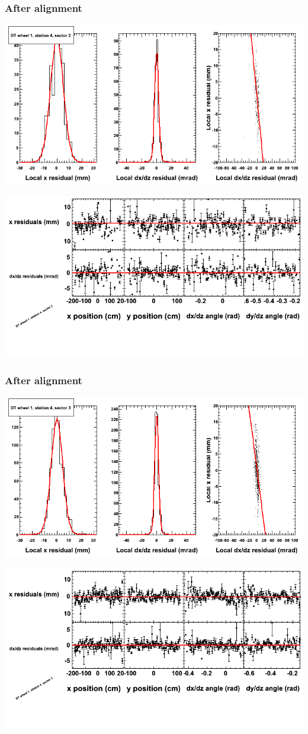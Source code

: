 \documentclass[compress]{beamer}
\begin{document}
\begin{frame}
\frametitle{After alignment}
\includegraphics[width=0.7\linewidth]{NOV4_fitfunctions/MBwhDst4sec02_bellcurves.png}

\includegraphics[width=0.7\linewidth]{NOV4_fitfunctions/MBwhDst4sec02_polynomials.png}
\end{frame}

\begin{frame}
\frametitle{After alignment}
\includegraphics[width=0.7\linewidth]{NOV4_fitfunctions/MBwhDst4sec03_bellcurves.png}

\includegraphics[width=0.7\linewidth]{NOV4_fitfunctions/MBwhDst4sec03_polynomials.png}
\end{frame}
\end{document}

